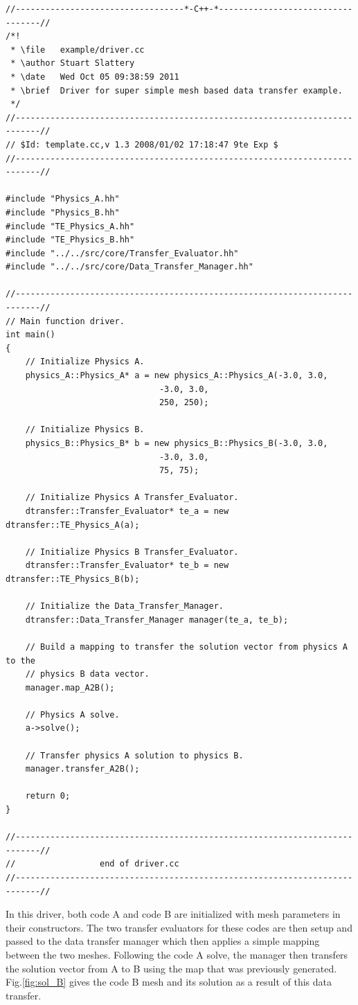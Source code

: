 \documentclass[letterpaper]{article}
\begin{document}
\begin{lstlisting}
//----------------------------------*-C++-*----------------------------------//
/*!
 * \file   example/driver.cc
 * \author Stuart Slattery
 * \date   Wed Oct 05 09:38:59 2011
 * \brief  Driver for super simple mesh based data transfer example.
 */
//---------------------------------------------------------------------------//
// $Id: template.cc,v 1.3 2008/01/02 17:18:47 9te Exp $
//---------------------------------------------------------------------------//

#include "Physics_A.hh"
#include "Physics_B.hh"
#include "TE_Physics_A.hh"
#include "TE_Physics_B.hh"
#include "../../src/core/Transfer_Evaluator.hh"
#include "../../src/core/Data_Transfer_Manager.hh"

//---------------------------------------------------------------------------//
// Main function driver.
int main()
{
    // Initialize Physics A.
    physics_A::Physics_A* a = new physics_A::Physics_A(-3.0, 3.0,
						       -3.0, 3.0,
						       250, 250);

    // Initialize Physics B.
    physics_B::Physics_B* b = new physics_B::Physics_B(-3.0, 3.0,
						       -3.0, 3.0,
						       75, 75);

    // Initialize Physics A Transfer_Evaluator.
    dtransfer::Transfer_Evaluator* te_a = new dtransfer::TE_Physics_A(a);

    // Initialize Physics B Transfer_Evaluator.
    dtransfer::Transfer_Evaluator* te_b = new dtransfer::TE_Physics_B(b);

    // Initialize the Data_Transfer_Manager.
    dtransfer::Data_Transfer_Manager manager(te_a, te_b);

    // Build a mapping to transfer the solution vector from physics A to the
    // physics B data vector.
    manager.map_A2B();

    // Physics A solve.
    a->solve();

    // Transfer physics A solution to physics B.
    manager.transfer_A2B();

    return 0;
}

//---------------------------------------------------------------------------//
//                 end of driver.cc
//---------------------------------------------------------------------------//
\end{lstlisting}

In this driver, both code A and code B are initialized with mesh
parameters in their constructors. The two transfer evaluators for
these codes are then setup and passed to the data transfer
manager which then applies a simple mapping between the two
meshes. Following the code A solve, the manager then transfers the
solution vector from A to B using the map that was previously
generated. Fig.\ref{fig:sol_B} gives the code B mesh and its solution
as a result of this data transfer.
\end{document}
